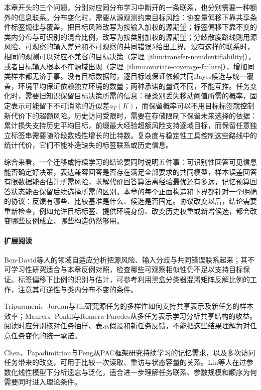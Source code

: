 本章开头的三个问题，分别对应同分布学习中断开的一条联系，也分别需要一种额外的信息联系。分布变化时，需要从源观测约束目标风险：协变量偏移下靠共享条件标签规律与覆盖，把目标风险改写为按输入加权的源期望；标签偏移下靠不变的类内分布与可识别的混合比例，改写为按类别加权的源期望；分歧散度路线则用源风险、可观察的输入差异和不可观察的共同错误$\lambda$给出上界。没有这样的联系时，相同的观测可以对应不兼容的目标决策（定理~\ref{thm:transfer-nonidentifiability}），或者目标输入根本不在源域出现（定理~\ref{thm:covariate-coverage-failure}），增加同类样本都无济于事。没有目标数据时，逐目标域保证依赖共同Bayes候选与统一覆盖，环境平均保证依赖独立环境的数量；两种承诺的量词不同，不能互推。任务变化时，需要旧知识保留目标决策所需的信息：硬类别丢失移动阈值所需的概率，固定表示可能留下不可消除的近似差$a_T(K)$，而保留概率可以不用目标标签就控制新代价下的超额风险。历史访问受限时，需要在存储限制下保留未来选择的依据：累计损失支持历史平均目标，前缀最大经验超额风险支持逐域目标，而保留任意独立标签串需要随阶段数线性增长的比特数。复杂度与稳定性工具控制这些路线中的统计代价，它们不能补造缺失的标签联系或历史信息。

综合来看，一个迁移或持续学习的结论要同时说明五件事：可识别性回答可见信息能否确定好决策，表达兼容回答是否存在满足全部要求的共同模型，样本误差回答有限数据能否估计所需风险，求解代价回答算法离经验最优还有多远，记忆预算回答状态能否保留后续选择所需的区别。本章的每个正面构造和下界都针对一个明确的协议：反馈有哪些、比较基准是什么、候选是否固定。协议改变以后，结论需要重新检查，例如允许目标标签、提供环境身份、改变历史权重或新增候选，都会改变哪些反例成立、哪些构造仍然够用。

\paragraph{扩展阅读}
Ben-David等人的领域自适应分析把源风险、输入分歧与共同错误联系起来；其不可学习性研究适合与本章反例对照，检查哪些可观察相似性仍不足以支持目标保证。标签偏移下比例的识别与估计，可参考利用黑盒分类器混淆矩阵反解比例的工作，注意其可逆性与类内分布不变的条件。

Tripuraneni、Jordan与Jin研究源任务的多样性如何支持共享表示及新任务的样本效率；Maurer、Pontil与Romera-Paredes从多任务表示学习分析共享结构的收益。阅读时应分别核对任务抽样、表示假设和新任务反馈，不能把这些结果理解为对任意任务变化的统一承诺。

Chen、Papadimitriou与Peng从PAC框架研究持续学习的记忆需求，以及多次访问任务带来的改变，可用于比较一次读取、重访与状态容量的关系。Lin等人在过参数化线性模型下分析遗忘与泛化，适合进一步理解任务联系、参数规模和顺序为何需要同时进入理论条件。

